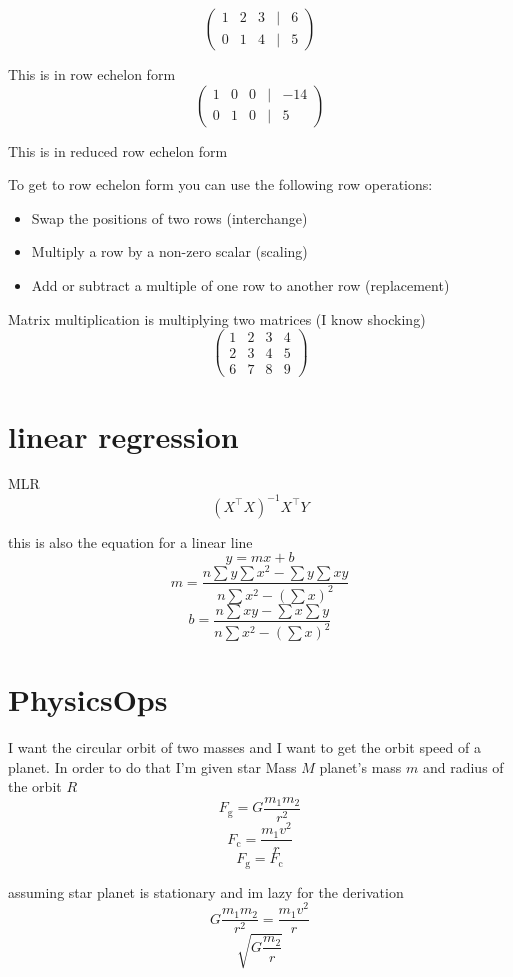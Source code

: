 \documentclass{article}
\begin{document}
$$\begin{pmatrix}
1 & 2 & 3 & | & 6 \\
0 & 1 & 4 & | & 5
\end{pmatrix}$$
\par{This is in row echelon form}
$$\begin{pmatrix}
1 & 0 & 0 & | & -14 \\
0 & 1 & 0 & | & 5
\end{pmatrix}$$

\par{This is in reduced row echelon form}\\
\par{To get to row echelon form you can use the following row operations:}
\begin{itemize}
    \item Swap the positions of two rows (interchange)
    \item Multiply a row by a non-zero scalar (scaling)
    \item Add or subtract a multiple of one row to another row (replacement)
\end{itemize}
\par{Matrix multiplication is multiplying two matrices (I know shocking)}
$$
\begin{pmatrix}
    1 & 2 & 3 & 4\\
    2 & 3 & 4 & 5\\
    6 & 7 & 8 & 9
\end{pmatrix}
$$
\section{linear regression}
\par{MLR}
$$(X^{\top}X)^{-1}X^{\top}Y$$
\par{this is also the equation for a linear line}
$$y = mx+b$$
$$m = \frac{n\sum{y}\sum{x^2}-\sum{y}\sum{xy}}{n\sum{x^2}-(\sum{x})^2}$$
$$b=\frac{n\sum{xy}-\sum{x}\sum{y}}{n\sum{x^2}-(\sum{x})^2}$$
\section{PhysicsOps}
\par{I want the circular orbit of two masses and I want to get the orbit speed of a planet.
In order to do that I'm given star Mass $M$ planet's mass $m$ and radius of the orbit $R$}
$$F_\text{g}=G\frac{m_1m_2}{r^2}$$
$$F_\text{c} = \frac{m_1v^2}{r}$$
$$F_\text{g} = F_\text{c}$$
\par{assuming star planet is stationary and im lazy for the derivation}
$$G\frac{m_1m_2}{r^2} = \frac{m_1v^2}{r}$$
$$\sqrt{G\frac{m_2}{r}}$$
\end{document}
